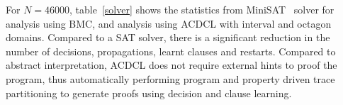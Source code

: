 For $N=46000$, table~\ref{solver} shows the statistics from 
MiniSAT~\cite{minisat} solver for analysis using BMC, and 
analysis using ACDCL with interval and octagon domains.  
Compared to a SAT solver, there is a significant reduction 
in the number of decisions, propagations, learnt clauses and 
restarts.  Compared to abstract interpretation, ACDCL does 
not require external hints to proof the program, thus 
automatically performing program and property driven trace 
partitioning to generate proofs using decision and clause learning.  
